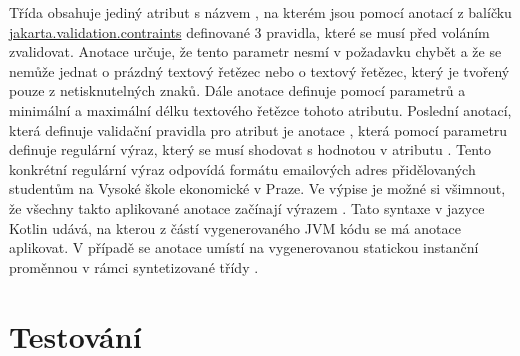 Třída  obsahuje jediný atribut s názvem , na kterém jsou pomocí anotací z balíčku \url{jakarta.validation.contraints} definované 3 pravidla, které se musí před voláním zvalidovat. Anotace  určuje, že tento parametr nesmí v požadavku chybět a že se nemůže jednat o prázdný textový řetězec nebo o textový řetězec, který je tvořený pouze z netisknutelných znaků. Dále anotace  definuje pomocí parametrů  a  minimální a maximální délku textového řetězce tohoto atributu. Poslední anotací, která definuje validační pravidla pro atribut  je anotace , která pomocí parametru  definuje regulární výraz, který se musí shodovat s hodnotou v atributu \cite[kap 2.3]{walls_spring_2019}. Tento konkrétní regulární výraz odpovídá formátu emailových adres přidělovaných studentům na Vysoké škole ekonomické v Praze. Ve výpise je možné si všimnout, že všechny takto aplikované anotace začínají výrazem . Tato syntaxe v jazyce Kotlin udává, na kterou z částí vygenerovaného JVM kódu se má anotace aplikovat. V případě  se anotace umístí na vygenerovanou statickou instanční proměnnou v rámci syntetizované třídy \cite{ebel_mastering_2019}.

\section{Testování}\label{sec:testovani}

